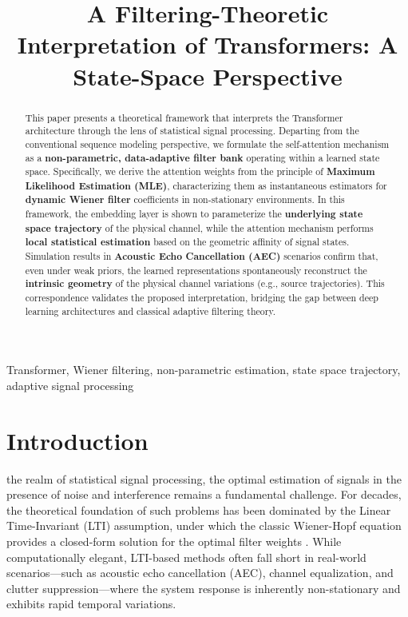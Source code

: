 \documentclass[conference]{IEEEtran}
\begin{document}
\title{A Filtering-Theoretic Interpretation of Transformers: A State-Space Perspective}

\author{
}

\maketitle

\begin{abstract}
This paper presents a theoretical framework that interprets the Transformer architecture through the lens of statistical signal processing. Departing from the conventional sequence modeling perspective, we formulate the self-attention mechanism as a \textbf{non-parametric, data-adaptive filter bank} operating within a learned state space. Specifically, we derive the attention weights from the principle of \textbf{Maximum Likelihood Estimation (MLE)}, characterizing them as instantaneous estimators for \textbf{dynamic Wiener filter} coefficients in non-stationary environments. In this framework, the embedding layer is shown to parameterize the \textbf{underlying state space trajectory} of the physical channel, while the attention mechanism performs \textbf{local statistical estimation} based on the geometric affinity of signal states. Simulation results in \textbf{Acoustic Echo Cancellation (AEC)} scenarios confirm that, even under weak priors, the learned representations spontaneously reconstruct the \textbf{intrinsic geometry} of the physical channel variations (e.g., source trajectories). This correspondence validates the proposed interpretation, bridging the gap between deep learning architectures and classical adaptive filtering theory.
\end{abstract}

\begin{IEEEkeywords}
Transformer, Wiener filtering, non-parametric estimation, state space trajectory, adaptive signal processing
\end{IEEEkeywords}

\section{Introduction}
 the realm of statistical signal processing, the optimal estimation of signals in the presence of noise and interference remains a fundamental challenge. For decades, the theoretical foundation of such problems has been dominated by the Linear Time-Invariant (LTI) assumption, under which the classic Wiener-Hopf equation provides a closed-form solution for the optimal filter weights \cite{wiener1949extrapolation}. While computationally elegant, LTI-based methods often fall short in real-world scenarios—such as acoustic echo cancellation (AEC), channel equalization, and clutter suppression—where the system response is inherently non-stationary and exhibits rapid temporal variations.
\end{document}
